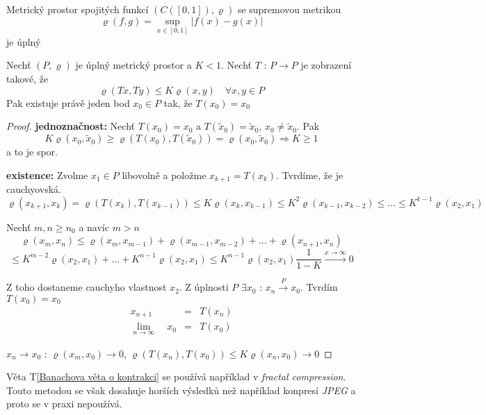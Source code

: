 \begin{vetat}
Metrický prostor spojitých funkcí $(C([0,1]), \varrho)$ se supremovou metrikou
$$\varrho(f,g) = \sup_{x \in [0,1]} |f(x) - g(x)|$$
je úplný
\end{vetat}

\begin{vetat}
\label{Banachova věta o kontrakci}
Nechť $(P, \varrho)$ je úplný metrický prostor a $K < 1$. Nechť $T \textrm{ : } P \rightarrow P$ je zobrazení takové, že 
$$\varrho(Tx, Ty) \leq K \varrho(x,y) \quad \forall x,y \in P$$
Pak existuje právě jeden bod $x_0 \in P$ tak, že $T(x_0)=x_0$
\end{vetat}

\begin{proof}
\textbf{jednoznačnost: } Nechť $T(x_0) = x_0$ a $T(\tilde{x}_0) = \tilde{x}_0$, $x_0 \neq \tilde{x}_0$. Pak 
$$K \varrho (x_0, \tilde{x}_0) \geq \varrho (T(x_0),T(\tilde{x}_0)) = \varrho (x_0, \tilde{x}_0) \Rightarrow K \geq 1$$
a to je spor.

\textbf{existence: } Zvolme $x_1 \in P$ libovolně a položme $x_{k+1} = T(x_k)$. Tvrdíme, že je cauchyovská.
$$\varrho( x_{k+1}, x_k ) = \varrho (T(x_k), T(x_{k-1})) \leq K \varrho (x_k,x_{k-1}) \leq K^2 \varrho (x_{k-1},x_{k-2}) \leq \ldots \leq K^{k-1} \varrho (x_2, x_1)$$

Nechť $m,n \geq n_0$ a navíc $m > n$
$$\varrho (x_m, x_n) \leq \varrho (x_m, x_{m-1}) + \varrho (x_{m-1}, x_{m-2}) + \ldots + \varrho (x_{n+1}, x_n) $$
$$\leq K^{m-2} \varrho (x_2, x_1) + \ldots + K^{n-1} \varrho (x_2, x_1) \leq K^{n-1} \varrho (x_2, x_1) \frac{1}{1-K} \overset{x \to \infty}{\to} 0$$

Z toho dostaneme cauchyho vlastnost $x_2$. Z úplnosti $P$ $\exists x_0 \textrm{ : } x_n \overset{P}{\to} x_0$. Tvrdím $T(x_0)=x_0$
\begin{eqnarray*}
x_{n+1} & = & T(x_n) \\
\lim_{n \to \infty} \quad x_0 & = & T(x_0)
\end{eqnarray*}

$x_n \to x_0 \textrm{ : } \varrho (x_m, x_0) \to 0$, $\varrho (T(x_n), T(x_0)) \leq K \varrho (x_n, x_0) \to 0$
\end{proof}

\begin{poznamka}
Věta T\ref{Banachova věta o kontrakci} se používá například v \emph{fractal compression}. Touto metodou se však dosahuje horších výsledků než například konpresí \emph{JPEG} a proto se v praxi nepoužívá.
\end{poznamka}



